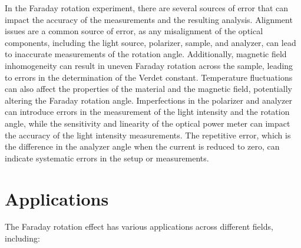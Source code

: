 \documentclass[11pt]{article}
\begin{document}
	In the Faraday rotation experiment, there are several sources of error that can impact the accuracy of the measurements and the resulting analysis. Alignment issues are a common source of error, as any misalignment of the optical components, including the light source, polarizer, sample, and analyzer, can lead to inaccurate measurements of the rotation angle. Additionally, magnetic field inhomogeneity can result in uneven Faraday rotation across the sample, leading to errors in the determination of the Verdet constant. Temperature fluctuations can also affect the properties of the material and the magnetic field, potentially altering the Faraday rotation angle. Imperfections in the polarizer and analyzer can introduce errors in the measurement of the light intensity and the rotation angle, while the sensitivity and linearity of the optical power meter can impact the accuracy of the light intensity measurements. The repetitive error, which is the difference in the analyzer angle when the current is reduced to zero, can indicate systematic errors in the setup or measurements.


\clearpage

	\section{Applications}

	The Faraday rotation effect has various applications across different fields, including:
\end{document}
